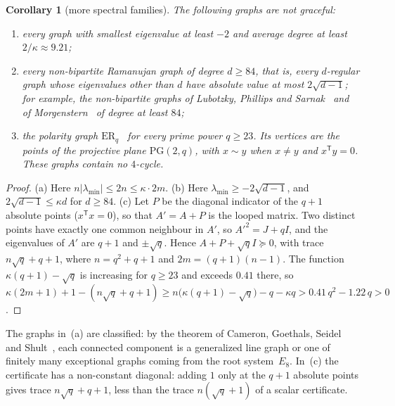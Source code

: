 \documentclass[11pt]{amsart}
\newcommand{\thmmarker}{}
\newcommand{\mnew}{\gdef\thmmarker{\textsuperscript{$\star$}}}
\theoremstyle{tplain}
\newtheorem{corollary}[theorem]{Corollary}
\theoremstyle{tdefinition}
\theoremstyle{tremark}
\newcommand{\lmin}{\lambda_{\min}}
\begin{document}
\mnew\begin{corollary}[more spectral families]\label{cor:spec2}
The following graphs are not graceful:
\begin{enumerate}[label=(\alph*)]
\item every graph with smallest eigenvalue at least $-2$ and average degree at
  least $2/\kappa\approx9.21$;
\item every non-bipartite Ramanujan graph of degree $d\ge84$, that is, every
  $d$-regular graph whose eigenvalues other than $d$ have absolute value at
  most $2\sqrt{d-1}$; for example, the non-bipartite graphs of Lubotzky,
  Phillips and Sarnak~\cite{lps} and of Morgenstern~\cite{morgenstern} of
  degree at least $84$;
\item the polarity graph $\mathrm{ER}_q$~\cite{er62,brown66} for every
  prime power $q\ge23$. Its
  vertices are the points of the projective plane $\mathrm{PG}(2,q)$, with
  $x\sim y$ when $x\ne y$ and $x^{\mathsf T}y=0$. These graphs contain no
  $4$-cycle.
\end{enumerate}
\end{corollary}

\begin{proof}
(a) Here $n|\lmin|\le2n\le\kappa\cdot2m$. (b) Here $\lmin\ge-2\sqrt{d-1}$, and
$2\sqrt{d-1}\le\kappa d$ for $d\ge84$. (c) Let $P$ be the diagonal indicator
of the $q+1$ absolute points ($x^{\mathsf T}x=0$), so that $A'=A+P$ is the
looped matrix. Two distinct points have exactly one common neighbour in $A'$,
so $A'^2=J+qI$, and the eigenvalues of $A'$ are $q+1$ and $\pm\sqrt q$. Hence
$A+P+\sqrt qI\succeq0$, with trace $n\sqrt q+q+1$, where $n=q^2+q+1$ and
$2m=(q+1)(n-1)$. The function $\kappa(q+1)-\sqrt q$ is increasing for
$q\ge23$ and exceeds $0.41$ there, so
$\kappa(2m+1)+1-(n\sqrt q+q+1)\ge n\bigl(\kappa(q+1)-\sqrt q\bigr)-q-\kappa q
>0.41\,q^2-1.22\,q>0$.
\end{proof}

The graphs in~(a) are classified: by the theorem of Cameron, Goethals, Seidel and
Shult~\cite{cgss}, each connected component is a generalized line graph or one
of finitely many exceptional graphs coming from the root system~$E_8$.
In~(c) the certificate has a non-constant diagonal: adding $1$ only at the
$q+1$ absolute points gives trace $n\sqrt q+q+1$, less than the trace
$n(\sqrt q+1)$ of a scalar certificate.
\end{document}

